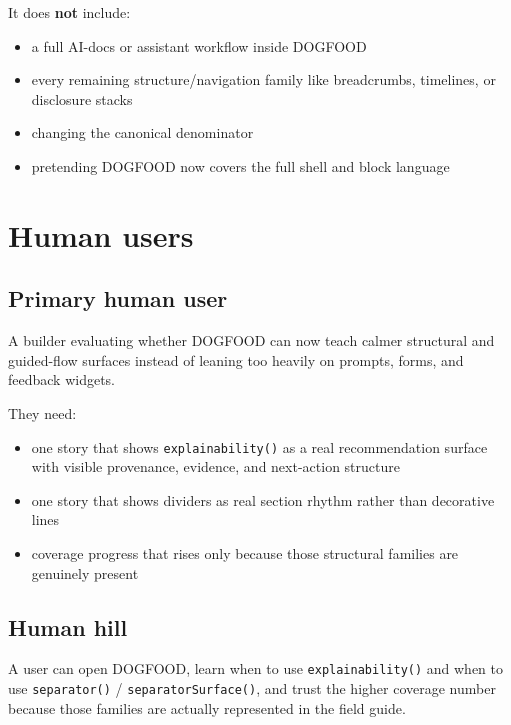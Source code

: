 It does \textbf{not} include:

\begin{itemize}
\tightlist
\item
  a full AI-docs or assistant workflow inside DOGFOOD
\item
  every remaining structure/navigation family like breadcrumbs, timelines, or disclosure stacks
\item
  changing the canonical denominator
\item
  pretending DOGFOOD now covers the full shell and block language
\end{itemize}

\section{Human users}\label{record-074-human-users}

\subsection{Primary human user}\label{record-074-primary-human-user}

A builder evaluating whether DOGFOOD can now teach calmer structural and guided-flow surfaces instead of leaning too heavily on prompts, forms, and feedback widgets.

They need:

\begin{itemize}
\tightlist
\item
  one story that shows \texttt{e\allowbreak{}x\allowbreak{}p\allowbreak{}l\allowbreak{}a\allowbreak{}i\allowbreak{}n\allowbreak{}a\allowbreak{}b\allowbreak{}i\allowbreak{}l\allowbreak{}i\allowbreak{}t\allowbreak{}y\allowbreak{}(\allowbreak{})} as a real recommendation surface with visible provenance, evidence, and next-action structure
\item
  one story that shows dividers as real section rhythm rather than decorative lines
\item
  coverage progress that rises only because those structural families are genuinely present
\end{itemize}

\subsection{Human hill}\label{record-074-human-hill}

A user can open DOGFOOD, learn when to use \texttt{e\allowbreak{}x\allowbreak{}p\allowbreak{}l\allowbreak{}a\allowbreak{}i\allowbreak{}n\allowbreak{}a\allowbreak{}b\allowbreak{}i\allowbreak{}l\allowbreak{}i\allowbreak{}t\allowbreak{}y\allowbreak{}(\allowbreak{})} and when to use \texttt{s\allowbreak{}e\allowbreak{}p\allowbreak{}a\allowbreak{}r\allowbreak{}a\allowbreak{}t\allowbreak{}o\allowbreak{}r\allowbreak{}(\allowbreak{})} / \texttt{s\allowbreak{}e\allowbreak{}p\allowbreak{}a\allowbreak{}r\allowbreak{}a\allowbreak{}t\allowbreak{}o\allowbreak{}r\allowbreak{}S\allowbreak{}u\allowbreak{}r\allowbreak{}f\allowbreak{}a\allowbreak{}c\allowbreak{}e\allowbreak{}(\allowbreak{})}, and trust the higher coverage number because those families are actually represented in the field guide.

